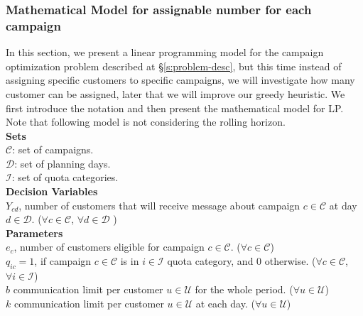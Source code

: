 \documentclass[11pt]{article}
\begin{document}
\subsubsection{Mathematical Model for assignable number for each campaign} \label{s:problem-math-lp}

In this section, we present a linear programming model for the campaign optimization problem described at \S \ref{s:problem-desc}, but this time instead of assigning specific customers to specific campaigns, we will investigate how many customer can be assigned, later that we will improve our greedy heuristic. We first introduce the notation and then present the mathematical model for LP. Note that following model is not considering the rolling horizon.\\
\noindent \textbf{Sets}\\

\noindent ${\mathcal{C}}$: set of campaigns. \\
\noindent ${\mathcal{D}}$: set of planning days. \\
\noindent ${\mathcal{I}}$: set of quota categories. \\

\noindent \textbf{Decision Variables}\\

\noindent $Y_{{c}{d}}$, number of customers that will receive message about campaign $c \in \mathcal{C}$ at day $d \in \mathcal{D}$.
($\forall c \in \mathcal{C}$, $\forall d \in \mathcal{D}$ )\\

\noindent \textbf{Parameters}\\

\noindent $e_{c}$, number of customers eligible for campaign $c \in \mathcal{C}$.
($\forall c \in \mathcal{C}$)\\

\noindent $q_{{i}{c}}=1$, if campaign $c \in \mathcal{C}$ is in $i \in \mathcal{I}$ quota category, and 0 otherwise.
($\forall c \in \mathcal{C}$, $\forall i \in \mathcal{I}$)\\

\noindent $b$ communication limit per customer $u \in \mathcal{U}$ for the whole period.
($\forall u \in \mathcal{U}$)\\

\noindent $k$ communication limit per customer $u \in \mathcal{U}$ at each day.
($\forall u \in \mathcal{U}$)\\
\end{document}
